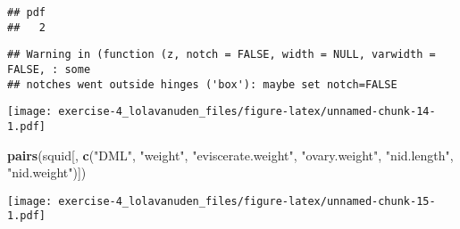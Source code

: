 \documentclass[
]{article}
\newenvironment{Shaded}{\begin{snugshade}}{\end{snugshade}}
\newcommand{\AttributeTok}[1]{\textcolor[rgb]{0.13,0.29,0.53}{#1}}
\newcommand{\ConstantTok}[1]{\textcolor[rgb]{0.56,0.35,0.01}{#1}}
\newcommand{\DecValTok}[1]{\textcolor[rgb]{0.00,0.00,0.81}{#1}}
\newcommand{\FunctionTok}[1]{\textcolor[rgb]{0.13,0.29,0.53}{\textbf{#1}}}
\newcommand{\NormalTok}[1]{#1}
\newcommand{\SpecialCharTok}[1]{\textcolor[rgb]{0.81,0.36,0.00}{\textbf{#1}}}
\newcommand{\StringTok}[1]{\textcolor[rgb]{0.31,0.60,0.02}{#1}}
\begin{document}
\begin{Shaded}
\end{Shaded}

\begin{verbatim}
## pdf 
##   2
\end{verbatim}

\begin{Shaded}
\end{Shaded}

\begin{verbatim}
## Warning in (function (z, notch = FALSE, width = NULL, varwidth = FALSE, : some
## notches went outside hinges ('box'): maybe set notch=FALSE
\end{verbatim}

\texttt{[image: exercise-4\_lolavanuden\_files/figure-latex/unnamed-chunk-14-1.pdf]}

\begin{Shaded}
\begin{Highlighting}[]
\FunctionTok{pairs}\NormalTok{(squid[, }\FunctionTok{c}\NormalTok{(}\StringTok{"DML"}\NormalTok{, }\StringTok{"weight"}\NormalTok{, }\StringTok{"eviscerate.weight"}\NormalTok{, }\StringTok{"ovary.weight"}\NormalTok{, }\StringTok{"nid.length"}\NormalTok{, }\StringTok{"nid.weight"}\NormalTok{)])}
\end{Highlighting}
\end{Shaded}

\texttt{[image: exercise-4\_lolavanuden\_files/figure-latex/unnamed-chunk-15-1.pdf]}
\end{document}
